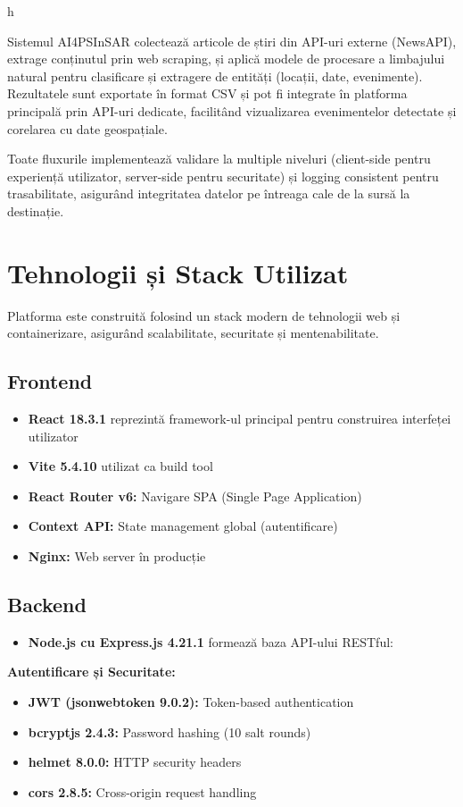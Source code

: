 h\documentclass[12pt,a4paper]{article}
\begin{document}
\hspace{1em} Sistemul AI4PSInSAR colectează articole de știri din API-uri externe (NewsAPI), extrage conținutul prin web scraping, și aplică modele de procesare a limbajului natural pentru clasificare și extragere de entități (locații, date, evenimente). Rezultatele sunt exportate în format CSV și pot fi integrate în platforma principală prin API-uri dedicate, facilitând vizualizarea evenimentelor detectate și corelarea cu date geospațiale.

Toate fluxurile implementează validare la multiple niveluri (client-side pentru experiență utilizator, server-side pentru securitate) și logging consistent pentru trasabilitate, asigurând integritatea datelor pe întreaga cale de la sursă la destinație.

\section{Tehnologii și Stack Utilizat}

Platforma este construită folosind un stack modern de tehnologii web și containerizare, asigurând scalabilitate, securitate și mentenabilitate.

\subsection{Frontend}
\begin{itemize}
    \item \textbf{React 18.3.1} reprezintă framework-ul principal pentru construirea interfeței utilizator
    \item \textbf{Vite 5.4.10} utilizat ca build tool
    \item \textbf{React Router v6:} Navigare SPA (Single Page Application)
    \item \textbf{Context API:} State management global (autentificare)
    \item \textbf{Nginx:} Web server în producție
\end{itemize}

\subsection{Backend}
\begin{itemize}
    \item \textbf{Node.js cu Express.js 4.21.1} formează baza API-ului RESTful:
\end{itemize}

\textbf{Autentificare și Securitate:}
\begin{itemize}
    \item \textbf{JWT (jsonwebtoken 9.0.2):} Token-based authentication
    \item \textbf{bcryptjs 2.4.3:} Password hashing (10 salt rounds)
    \item \textbf{helmet 8.0.0:} HTTP security headers
    \item \textbf{cors 2.8.5:} Cross-origin request handling
\end{itemize}
\end{document}
